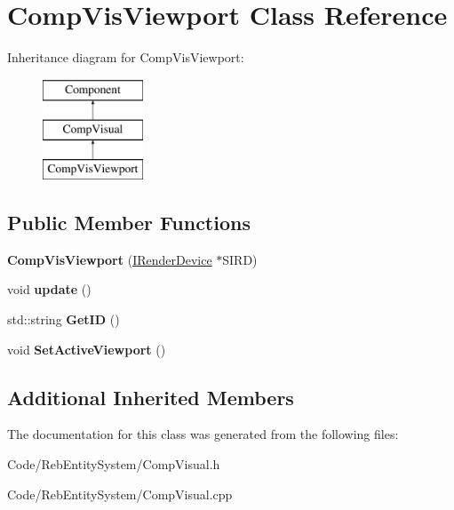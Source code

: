 \hypertarget{class_comp_vis_viewport}{}\section{Comp\+Vis\+Viewport Class Reference}
\label{class_comp_vis_viewport}
Inheritance diagram for Comp\+Vis\+Viewport\+:\begin{figure}[H]
\begin{center}
\leavevmode
\includegraphics[height=3.000000cm]{class_comp_vis_viewport}
\end{center}
\end{figure}
\subsection*{Public Member Functions}
\begin{DoxyCompactItemize}
\item 
{\bfseries Comp\+Vis\+Viewport} (\hyperlink{class_i_render_device}{I\+Render\+Device} $\ast$S\+I\+RD)\hypertarget{class_comp_vis_viewport_a1b86479fcbeb97248df7a2d061900fe1}{}\label{class_comp_vis_viewport_a1b86479fcbeb97248df7a2d061900fe1}

\item 
void {\bfseries update} ()\hypertarget{class_comp_vis_viewport_aa974c63d605e3ebc957f7ce18220a3f4}{}\label{class_comp_vis_viewport_aa974c63d605e3ebc957f7ce18220a3f4}

\item 
std\+::string {\bfseries Get\+ID} ()\hypertarget{class_comp_vis_viewport_a93e1dcc65e38f028323a5685cfac50cd}{}\label{class_comp_vis_viewport_a93e1dcc65e38f028323a5685cfac50cd}

\item 
void {\bfseries Set\+Active\+Viewport} ()\hypertarget{class_comp_vis_viewport_a4371621bdf3d252c66f2e2b2b6d01804}{}\label{class_comp_vis_viewport_a4371621bdf3d252c66f2e2b2b6d01804}

\end{DoxyCompactItemize}
\subsection*{Additional Inherited Members}


The documentation for this class was generated from the following files\+:\begin{DoxyCompactItemize}
\item 
Code/\+Reb\+Entity\+System/Comp\+Visual.\+h\item 
Code/\+Reb\+Entity\+System/Comp\+Visual.\+cpp\end{DoxyCompactItemize}
